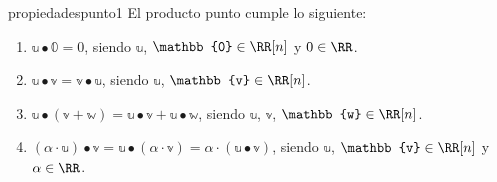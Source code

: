 \begin{theorem}{}{propiedadespunto1}
    El producto punto cumple lo siguiente:
    \begin{enumerate}[label=\roman*), topsep=6pt, itemsep=0pt]
        \item $\mathbb{u} \bullet \mathbb{0} = 0$, siendo $\mathbb{u}$, $\mathbb{0} \in \RR[n]$ y $0 \in \RR$.
        \item $\mathbb{u} \bullet \mathbb{v} = \mathbb{v} \bullet \mathbb{u}$, siendo $\mathbb{u}$, $\mathbb{v} \in \RR[n]$.
        \item $\mathbb{u} \bullet (\mathbb{v} + \mathbb{w}) = \mathbb{u} \bullet \mathbb{v} + \mathbb{u} \bullet \mathbb{w}$, siendo $\mathbb{u}$, $\mathbb{v}$, $\mathbb{w} \in \RR[n]$.
        \item $(\alpha \cdot \mathbb{u}) \bullet \mathbb{v} = \mathbb{u} \bullet (\alpha \cdot \mathbb{v}) = \alpha \cdot (\mathbb{u} \bullet \mathbb{v})$, siendo $\mathbb{u}$, $\mathbb{v} \in \RR[n]$ y $\alpha \in \RR$.
    \end{enumerate}


\end{theorem}
